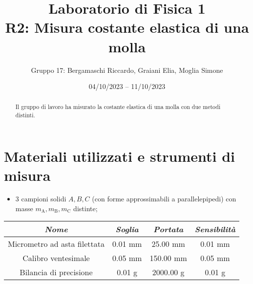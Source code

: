 \documentclass{article}
\title{
    Laboratorio di Fisica 1\\
    R2: Misura costante elastica di una molla
}
\author{Gruppo 17: Bergamaschi Riccardo, Graiani Elia, Moglia Simone}
\date{04/10/2023 – 11/10/2023}
\begin{document}
\maketitle

\begin{abstract}
    Il gruppo di lavoro ha misurato la costante elastica di una molla con due metodi distinti.
\end{abstract}

\section{Materiali utilizzati e strumenti di misura}
\begin{itemize}
    \item 3 campioni solidi $A,B,C$ (con forme approssimabili a parallelepipedi) con masse $m_\text{A}, m_\text{B}, m_\text{C}$ distinte;
\end{itemize}
\begin{center}
    \begin{tabular}{ |c|c|c|c| }
        \hline
        \emph{Nome} & \emph{Soglia} & \emph{Portata} & \emph{Sensibilità} \\
        \hline
        Micrometro ad asta filettata & 0.01 mm & 25.00 mm & 0.01 mm \\
        Calibro ventesimale & 0.05 mm & 150.00 mm & 0.05 mm \\
        Bilancia di precisione & 0.01 g & 2000.00 g & 0.01 g \\
        \hline
    \end{tabular}
\end{center}

\end{document}
